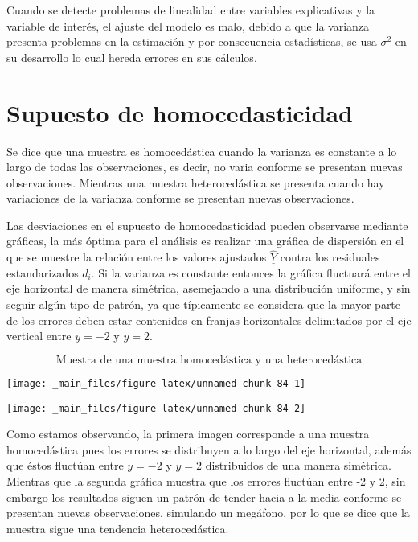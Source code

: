 \documentclass[a4paper,oneside,openany]{book}
\begin{document}
Cuando se detecte problemas de linealidad entre variables explicativas y
la variable de interés, el ajuste del modelo es malo, debido a que la
varianza presenta problemas en la estimación y por consecuencia
estadísticas, se usa \(\sigma^2\) en su desarrollo lo cual hereda
errores en sus cálculos.

\section{Supuesto de
homocedasticidad}\label{supuesto-de-homocedasticidad}

Se dice que una muestra es homocedástica cuando la varianza es constante
a lo largo de todas las observaciones, es decir, no varia conforme se
presentan nuevas observaciones. Mientras una muestra heterocedástica se
presenta cuando hay variaciones de la varianza conforme se presentan
nuevas observaciones.

Las desviaciones en el supuesto de homocedasticidad pueden observarse
mediante gráficas, la más óptima para el análisis es realizar una
gráfica de dispersión en el que se muestre la relación entre los valores
ajustados \(\underline{\hat{Y}}\) contra los residuales estandarizados
\(d_{i}\). Si la varianza es constante entonces la gráfica fluctuará
entre el eje horizontal de manera simétrica, asemejando a una
distribución uniforme, y sin seguir algún tipo de patrón, ya que
típicamente se considera que la mayor parte de los errores deben estar
contenidos en franjas horizontales delimitados por el eje vertical entre
\(y=-2\) y \(y=2\).

\[\mbox{Muestra de una muestra homocedástica y una heterocedástica}\]

\begin{center}\texttt{[image: \_main\_files/figure-latex/unnamed-chunk-84-1]} \end{center}

\begin{center}\texttt{[image: \_main\_files/figure-latex/unnamed-chunk-84-2]} \end{center}

Como estamos observando, la primera imagen corresponde a una muestra
homocedástica pues los errores se distribuyen a lo largo del eje
horizontal, además que éstos fluctúan entre \(y=-2\) y \(y=2\)
distribuidos de una manera simétrica. Mientras que la segunda gráfica
muestra que los errores fluctúan entre -2 y 2, sin embargo los
resultados siguen un patrón de tender hacia a la media conforme se
presentan nuevas observaciones, simulando un megáfono, por lo que se
dice que la muestra sigue una tendencia heterocedástica.
\end{document}
